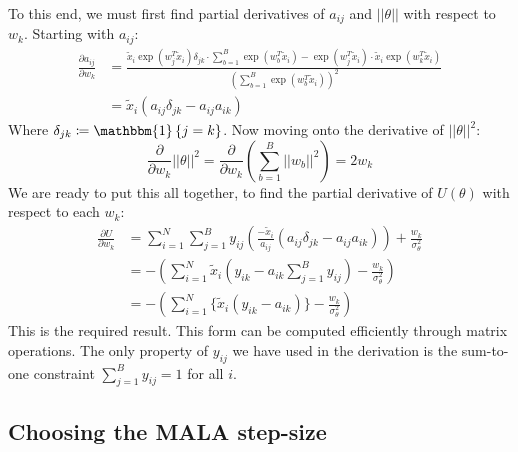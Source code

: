 \documentclass{article}
\newcommand{\one}{\mathbbm{1}}
\begin{document}
To this end, we must first find partial derivatives of $a_{ij}$ and $||\theta||$ with respect to $w_k$. Starting with $a_{ij}$:
%
\begin{align}
	\frac{\partial a_{ij}}{\partial w_k} &= \frac
	{\tilde{x}_i \exp(w_j^T \tilde{x}_i) \delta_{jk} \cdot \sum_{b=1}^{B} \exp(w_b^T \tilde{x}_i) 
		- 
	\exp(w_j^T \tilde{x}_i) \cdot \tilde{x}_i \exp(w_k^T \tilde{x}_i)}
	{\left( \sum_{b=1}^{B} \exp(w_b^T \tilde{x}_i) \right)^2} \nonumber \\
	&= \tilde{x}_i \left( a_{ij} \delta_{jk} - a_{ij}a_{ik} \right) 
\end{align}
%
Where $\delta_{jk} \coloneqq \one \left\{ j = k \right\}$. Now moving onto the derivative of $||\theta||^2$:
%
\begin{equation}
	\frac{ \partial}{\partial w_k} ||\theta||^2 = \frac{\partial}{\partial w_k} \left( \sum_{b=1}^B ||w_b||^2 \right) = 2w_k
\end{equation}
%
We are ready to put this all together, to find the partial derivative of $U(\theta)$ with respect to each $w_k$:
\begin{align}
	\frac{\partial U}{\partial w_k} &= 
	\sum_{i=1}^{N} \sum_{j=1}^{B} y_{ij} 
	\left( \frac{-\tilde{x}_i}{a_{ij}} \left( a_{ij} \delta_{jk} - a_{ij} a_{ik} \right) \right)
	+ \frac{w_k}{\sigma_\theta^2} \nonumber \\
	&=  - \left( \sum_{i=1}^{N} \tilde{x}_i \left( y_{ik} - a_{ik} \sum_{j=1}^{B} y_{ij} \right)
	- \frac{w_k}{\sigma_\theta^2} \right) \nonumber \\
	&= - \left( \sum_{i=1}^{N} \Big\{ \tilde{x}_i (y_{ik} - a_{ik}) \Big\} - \frac{w_k}{\sigma_\theta^2} \right)
\end{align}
%
This is the required result. This form can be computed efficiently through matrix operations. The only property of $y_{ij}$ we have used in the derivation is the sum-to-one constraint $\sum_{j=1}^{B} y_{ij} = 1$ for all $i$.

\subsection{Choosing the MALA step-size}
\label{appdx:step-size}
\end{document}
